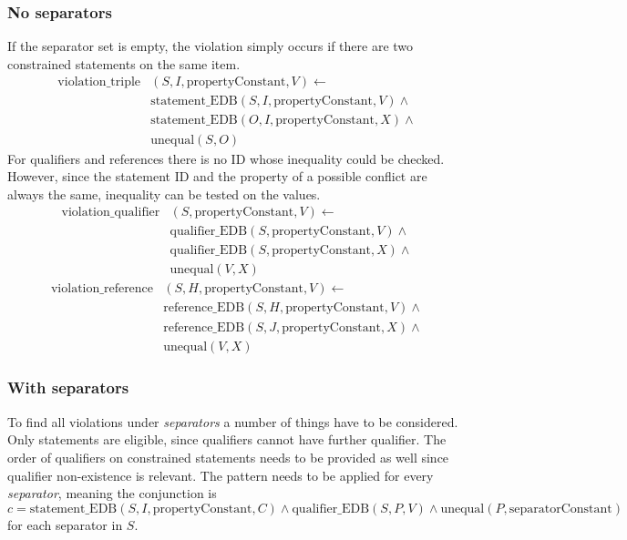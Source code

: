 \documentclass[hyperref,bachelorofscience,fleqn]{cgvpub}
\begin{document}
\subsubsection{No separators}
If the separator set is empty, the violation simply occurs if there are two constrained statements on the same item. 
\begin{equation}\label{eq_no_separators_triple}
\begin{split}
\text{violation\_triple}&(S, I, \text{propertyConstant}, V) \leftarrow \\
&\text{statement\_EDB}(S, I, \text{propertyConstant}, V) \wedge{} \\
&\text{statement\_EDB}(O, I, \text{propertyConstant}, X) \wedge{} \\
&\text{unequal}(S, O)
\end{split}
\end{equation}
For qualifiers and references there is no ID whose inequality could be checked. However, since the statement ID and the property of a possible conflict are always the same, inequality can be tested on the values.
\begin{equation*}
\begin{split}
\text{violation\_qualifier}&(S, \text{propertyConstant}, V) \leftarrow \\
&\text{qualifier\_EDB}(S, \text{propertyConstant}, V) \wedge{} \\
&\text{qualifier\_EDB}(S, \text{propertyConstant}, X) \wedge{} \\
&\text{unequal}(V, X)
\end{split}
\end{equation*}
\begin{equation*}
\begin{split}
\text{violation\_reference}&(S, H, \text{propertyConstant}, V) \leftarrow \\
&\text{reference\_EDB}(S, H, \text{propertyConstant}, V) \wedge{} \\
&\text{reference\_EDB}(S, J, \text{propertyConstant}, X) \wedge{} \\
&\text{unequal}(V, X)
\end{split}
\end{equation*}

\subsubsection{With separators}\label{subsubsec_with_separators}
To find all violations under \emph{separators} a number of things have to be considered. Only statements are eligible, since qualifiers cannot have further qualifier. The order of qualifiers on constrained statements needs to be provided as well since qualifier non-existence is relevant. The pattern needs to be applied for every \emph{separator}, meaning the conjunction is
\begin{equation*}
c = \text{statement\_EDB}(S, I, \text{propertyConstant}, C) \wedge \text{qualifier\_EDB}(S, P, V) \wedge \text{unequal}(P, \text{separatorConstant})
\end{equation*}
for each separator in \(S\).\\
\end{document}
